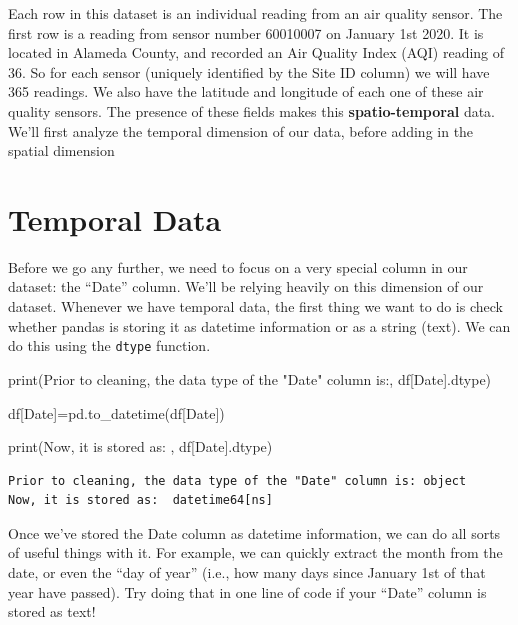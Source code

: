 \documentclass[
  letterpaper,
  DIV=11,
  numbers=noendperiod]{scrreprt}
\newenvironment{Shaded}{\begin{snugshade}}{\end{snugshade}}
\newcommand{\BuiltInTok}[1]{\textcolor[rgb]{0.00,0.23,0.31}{#1}}
\newcommand{\NormalTok}[1]{\textcolor[rgb]{0.00,0.23,0.31}{#1}}
\newcommand{\OperatorTok}[1]{\textcolor[rgb]{0.37,0.37,0.37}{#1}}
\newcommand{\StringTok}[1]{\textcolor[rgb]{0.13,0.47,0.30}{#1}}
\begin{document}
Each row in this dataset is an individual reading from an air quality
sensor. The first row is a reading from sensor number 60010007 on
January 1st 2020. It is located in Alameda County, and recorded an Air
Quality Index (AQI) reading of 36. So for each sensor (uniquely
identified by the Site ID column) we will have 365 readings. We also
have the latitude and longitude of each one of these air quality
sensors. The presence of these fields makes this
\textbf{spatio-temporal} data. We'll first analyze the temporal
dimension of our data, before adding in the spatial dimension

\hypertarget{temporal-data}{%
\section{Temporal Data}\label{temporal-data}}

Before we go any further, we need to focus on a very special column in
our dataset: the ``Date'' column. We'll be relying heavily on this
dimension of our dataset. Whenever we have temporal data, the first
thing we want to do is check whether pandas is storing it as datetime
information or as a string (text). We can do this using the
\texttt{dtype} function.

\begin{Shaded}
\begin{Highlighting}[]
\BuiltInTok{print}\NormalTok{(}\StringTok{\textquotesingle{}Prior to cleaning, the data type of the "Date" column is:\textquotesingle{}}\NormalTok{, df[}\StringTok{\textquotesingle{}Date\textquotesingle{}}\NormalTok{].dtype)}

\NormalTok{df[}\StringTok{\textquotesingle{}Date\textquotesingle{}}\NormalTok{]}\OperatorTok{=}\NormalTok{pd.to\_datetime(df[}\StringTok{\textquotesingle{}Date\textquotesingle{}}\NormalTok{])}

\BuiltInTok{print}\NormalTok{(}\StringTok{\textquotesingle{}Now, it is stored as: \textquotesingle{}}\NormalTok{, df[}\StringTok{\textquotesingle{}Date\textquotesingle{}}\NormalTok{].dtype)}
\end{Highlighting}
\end{Shaded}

\begin{verbatim}
Prior to cleaning, the data type of the "Date" column is: object
Now, it is stored as:  datetime64[ns]
\end{verbatim}

Once we've stored the Date column as datetime information, we can do all
sorts of useful things with it. For example, we can quickly extract the
month from the date, or even the ``day of year'' (i.e., how many days
since January 1st of that year have passed). Try doing that in one line
of code if your ``Date'' column is stored as text!
\end{document}
